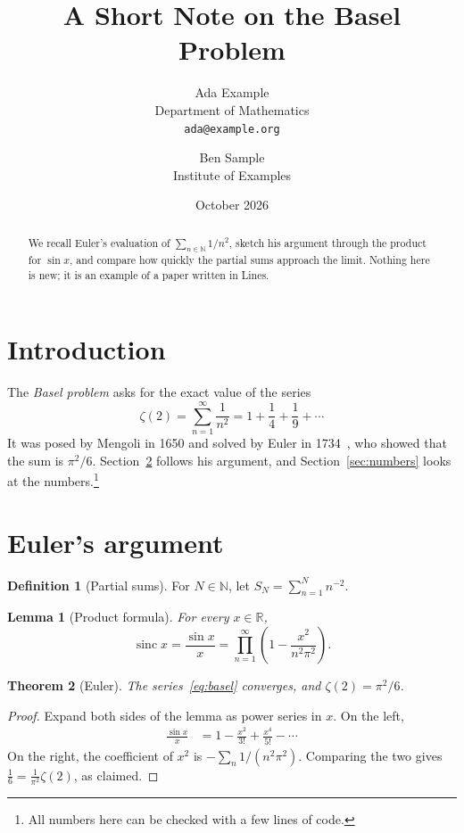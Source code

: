 \documentclass[11pt]{article}
\title{A Short Note on the Basel Problem}
\author{Ada Example \\ Department of Mathematics \\ \texttt{ada@example.org} \and Ben Sample \\ Institute of Examples}
\date{October 2026}
\newcommand{\N}{\mathbb{N}}
\newcommand{\R}{\mathbb{R}}
\newcommand{\partialsum}[1]{S_{#1}}
\DeclareMathOperator{\sinc}{sinc}
\newtheorem{theorem}{Theorem}
\newtheorem{lemma}[theorem]{Lemma}
\theoremstyle{definition}
\newtheorem{defn}{Definition}
\begin{document}
\maketitle

\begin{abstract}
We recall Euler's evaluation of $\sum_{n \in \N} 1/n^2$, sketch his argument through the product for $\sin x$, and compare how quickly the partial sums approach the limit. Nothing here is new; it is an example of a paper written in Lines.
\end{abstract}

\section{Introduction}
\label{sec:intro}

The \emph{Basel problem} asks for the exact value of the series
\begin{equation}
  \zeta(2) = \sum_{n=1}^{\infty} \frac{1}{n^2} = 1 + \frac{1}{4} + \frac{1}{9} + \cdots
  \label{eq:basel}
\end{equation}
It was posed by Mengoli in 1650 and solved by Euler in 1734~\cite{euler1740}, who showed that the sum is $\pi^2/6$. Section~\ref{sec:proof} follows his argument, and Section~\ref{sec:numbers} looks at the numbers.\footnote{All numbers here can be checked with a few lines of code.}

\section{Euler's argument}
\label{sec:proof}

\begin{defn}[Partial sums]
For $N \in \N$, let $\partialsum{N} = \sum_{n=1}^{N} n^{-2}$.
\end{defn}

\begin{lemma}[Product formula]
For every $x \in \R$,
\[ \sinc x = \frac{\sin x}{x} = \prod_{n=1}^{\infty} \left( 1 - \frac{x^2}{n^2 \pi^2} \right). \]
\end{lemma}

\begin{theorem}[Euler]
\label{thm:basel}
The series~\eqref{eq:basel} converges, and $\zeta(2) = \pi^2 / 6$.
\end{theorem}

\begin{proof}
Expand both sides of the lemma as power series in $x$. On the left,
\begin{align*}
  \frac{\sin x}{x} &= 1 - \frac{x^2}{3!} + \frac{x^4}{5!} - \cdots
\end{align*}
On the right, the coefficient of $x^2$ is $-\sum_{n} 1/(n^2 \pi^2)$. Comparing the two gives $\frac{1}{6} = \frac{1}{\pi^2} \zeta(2)$, as claimed.
\end{proof}
\end{document}

